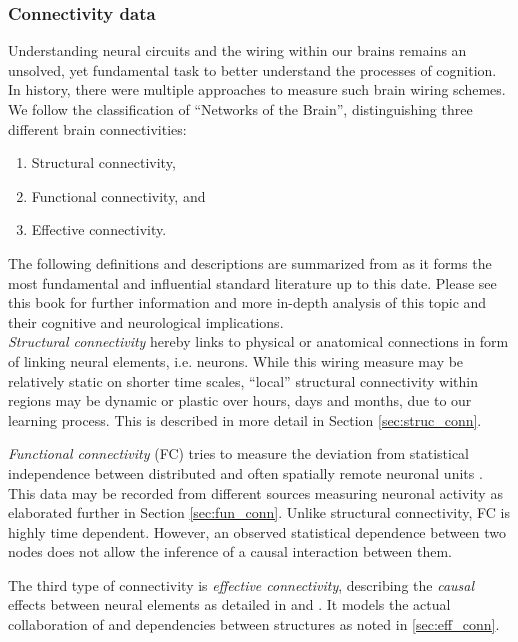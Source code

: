 \documentclass[]{article}
\renewcommand{\cite}{\citep}
\begin{document}
\subsubsection{Connectivity data}
Understanding neural circuits and the wiring within our brains remains an unsolved, yet fundamental task to better understand the processes of cognition. In history, there were multiple approaches to measure such brain wiring schemes. We follow the classification of ``Networks of the Brain''\cite{sporns2016networks}, distinguishing three different brain connectivities:
\begin{enumerate}
	\item Structural connectivity,
	\item Functional connectivity, and 
	\item Effective connectivity.
\end{enumerate}

The following definitions and descriptions are summarized from \citet[pp. 37-40]{sporns2016networks} as it forms the most fundamental and influential standard literature up to this date. Please see this book for further information and more in-depth analysis of this topic and their cognitive and neurological implications.\\

\textit{Structural connectivity} hereby links to physical or anatomical connections in form of linking neural elements, i.e. neurons. While this wiring measure may be relatively static on shorter time scales, ``local'' structural connectivity within regions may be dynamic or plastic over hours, days and months, due to our learning process. This is described in more detail in Section \ref{sec:struc_conn}.

\textit{Functional connectivity} (FC) tries to measure the deviation from statistical independence between distributed and often spatially remote neuronal units \cite{friston1993functional, friston1994statistical}. This data may be recorded from different sources measuring neuronal activity as elaborated further in Section \ref{sec:fun_conn}. Unlike structural connectivity, FC is highly time dependent. However, an observed statistical dependence between two nodes does not allow the inference of a causal interaction between them.

The third type of connectivity is \textit{effective connectivity}, describing the \textit{causal} effects between neural elements as detailed in \citet{friston1994functional} and \citet{friston2000attentional}. It models the actual collaboration of and dependencies between structures as noted in \ref{sec:eff_conn}.\\
\end{document}
